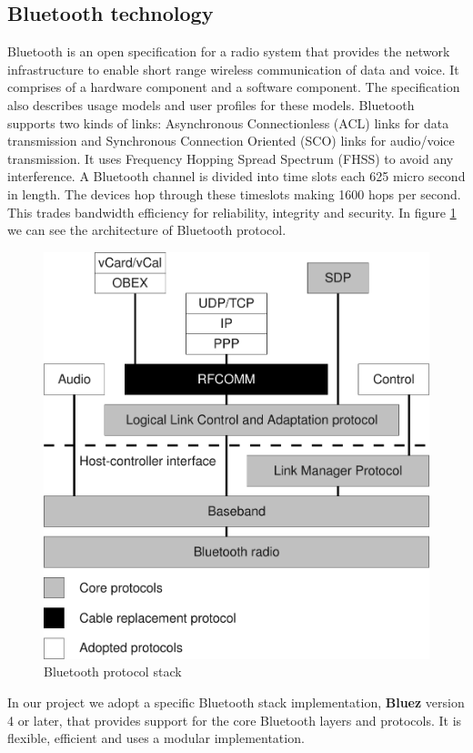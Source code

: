 \documentclass[conference]{IEEEtran}
\begin{document}
\subsection{Bluetooth technology}
Bluetooth is an open specification for a radio system that provides the network infrastructure to enable short range wireless communication of data and voice. It comprises of a hardware component and a software component. The specification also describes usage models and user profiles for these models.
Bluetooth supports two kinds of links: Asynchronous Connectionless (ACL) links for data transmission and Synchronous Connection Oriented (SCO) links for audio/voice transmission. It uses Frequency Hopping Spread Spectrum (FHSS) to avoid any interference. A Bluetooth channel is divided into time slots each 625 micro second in length. The devices hop through these timeslots making 1600 hops per second. This trades bandwidth efficiency for reliability, integrity and security.
In figure \ref{stack} we can see the architecture of Bluetooth protocol.\\
\begin{figure}[h]
\centering
\includegraphics[scale = 0.3]{BTstack.pdf}
\caption{Bluetooth protocol stack}
\label{stack}
\end{figure}
In our project we adopt a specific Bluetooth stack implementation, \textbf{Bluez} version 4 or later, that provides support for the core Bluetooth layers and protocols. It is flexible, efficient and uses a modular implementation. \\
\end{document}
